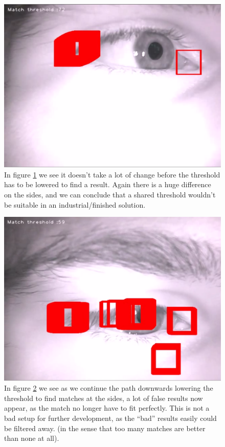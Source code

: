 \begin{figure}[htbp]
\centering
\includegraphics{pics/template_matching/5.png}
\caption{In figure \ref{tm5} we see it doesn't take a lot of change
before the threshold has to be lowered to find a result. Again there is
a huge difference on the sides, and we can conclude that a shared
threshold wouldn't be suitable in an industrial/finished solution.
\label{tm5}}
\end{figure}

\begin{figure}[htbp]
\centering
\includegraphics{pics/template_matching/6.png}
\caption{In figure \ref{tm6} we see as we continue the path downwards
lowering the threshold to find matches at the sides, a lot of false
results now appear, as the match no longer have to fit perfectly. This
is not a bad setup for further development, as the ``bad'' results
easily could be filtered away. (in the sense that too many matches are
better than none at all). \label{tm6}}
\end{figure}


